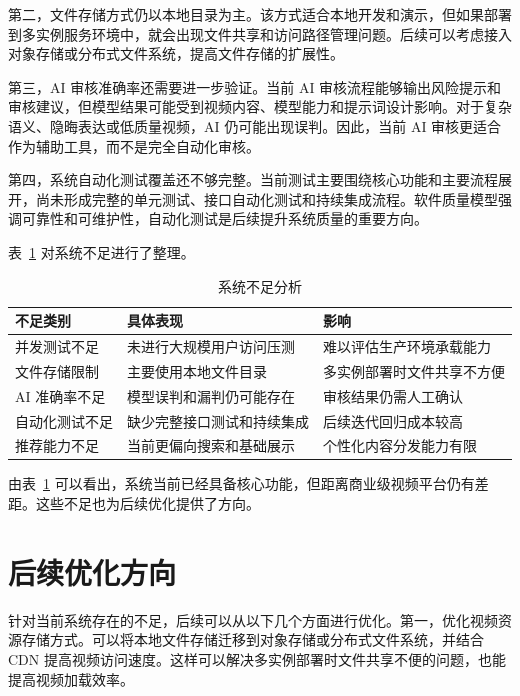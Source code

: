 第二，文件存储方式仍以本地目录为主。该方式适合本地开发和演示，但如果部署到多实例服务环境中，就会出现文件共享和访问路径管理问题。后续可以考虑接入对象存储或分布式文件系统，提高文件存储的扩展性。

第三，AI 审核准确率还需要进一步验证。当前 AI 审核流程能够输出风险提示和审核建议，但模型结果可能受到视频内容、模型能力和提示词设计影响。对于复杂语义、隐晦表达或低质量视频，AI 仍可能出现误判。因此，当前 AI 审核更适合作为辅助工具，而不是完全自动化审核。

第四，系统自动化测试覆盖还不够完整。当前测试主要围绕核心功能和主要流程展开，尚未形成完整的单元测试、接口自动化测试和持续集成流程。软件质量模型强调可靠性和可维护性，自动化测试是后续提升系统质量的重要方向\cite{iso25010}。

表~\ref{tab:project-limitations} 对系统不足进行了整理。

\begin{table}[htbp]
  \centering
  \caption{系统不足分析}
  \label{tab:project-limitations}
  \begin{tabular}{p{}p{}p{}}
    \hline
    \textbf{不足类别} & \textbf{具体表现} & \textbf{影响} \\
    \hline
    并发测试不足 & 未进行大规模用户访问压测 & 难以评估生产环境承载能力 \\
    文件存储限制 & 主要使用本地文件目录 & 多实例部署时文件共享不方便 \\
    AI 准确率不足 & 模型误判和漏判仍可能存在 & 审核结果仍需人工确认 \\
    自动化测试不足 & 缺少完整接口测试和持续集成 & 后续迭代回归成本较高 \\
    推荐能力不足 & 当前更偏向搜索和基础展示 & 个性化内容分发能力有限 \\
    \hline
  \end{tabular}
\end{table}

由表~\ref{tab:project-limitations} 可以看出，系统当前已经具备核心功能，但距离商业级视频平台仍有差距。这些不足也为后续优化提供了方向。

\section{后续优化方向}
\label{sec:future-work}

针对当前系统存在的不足，后续可以从以下几个方面进行优化。第一，优化视频资源存储方式。可以将本地文件存储迁移到对象存储或分布式文件系统，并结合 CDN 提高视频访问速度。这样可以解决多实例部署时文件共享不便的问题，也能提高视频加载效率。

